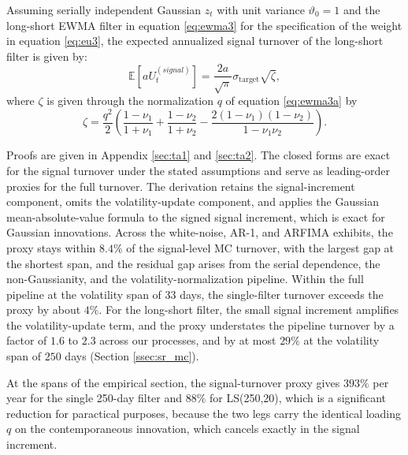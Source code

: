 \documentclass[hidelinks]{siamonline250211}
\begin{document}
\begin{proposition}\label{pr:turnover2}
	
	Assuming serially independent Gaussian $z_{t}$ with unit variance $\vartheta_{0}=1$ and the long-short EWMA filter in equation \eqref{eq:ewma3} for the specification of the weight in equation \eqref{eq:eu3}, the expected annualized signal turnover of the long-short filter is given by:
	\begin{equation} \label{eq:tur_ls} 
		\mathbb{E}\left[ a U^{(signal)}_{t} \right]   =  \frac{2a}{\sqrt{\pi}}\sigma_{\mathrm{target}} \sqrt{\zeta},
	\end{equation}
	where $\zeta$ is given through the normalization $q$ of equation \eqref{eq:ewma3a} by
	\begin{equation*}
		\zeta = \frac{q^{2}}{2}\left( \frac{1-\nu_{1}}{1+\nu_{1}}  +  \frac{1-\nu_{2}}{1+\nu_{2}}  - \frac{2\left( 1-\nu_{1}\right) \left( 1-\nu_{2}\right)}{1-\nu_{1}\nu_{2}}\right).
	\end{equation*}
	
\end{proposition}

Proofs are given in Appendix \ref{sec:ta1} and \ref{sec:ta2}. The closed forms are exact for the signal turnover under the stated assumptions and serve as leading-order proxies for the full turnover. The derivation retains the signal-increment component, omits the volatility-update component, and applies the Gaussian mean-absolute-value formula to the signed signal increment, which is exact for Gaussian innovations. Across the white-noise, AR-1, and ARFIMA exhibits, the proxy stays within $8.4\%$ of the signal-level MC turnover, with the largest gap at the shortest span, and the residual gap arises from the serial dependence, the non-Gaussianity, and the volatility-normalization pipeline. Within the full pipeline at the volatility span of $33$ days, the single-filter turnover exceeds the proxy by about $4\%$. For the long-short filter, the small signal increment amplifies the volatility-update term, and the proxy understates the pipeline turnover by a factor of $1.6$ to $2.3$ across our processes, and by at most $29\%$ at the volatility span of $250$ days (Section \ref{ssec:sr_mc}).


At the spans of the empirical section, the signal-turnover proxy gives $393\%$ per year for the single 250-day filter and $88\%$ for LS(250,20), which is a significant reduction for paractical purposes, because the two legs carry the identical loading $q$ on the contemporaneous innovation, which cancels exactly in the signal increment.
\end{document}
